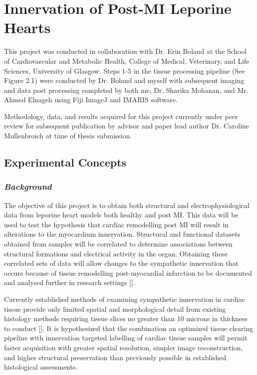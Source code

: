 \section{Innervation of Post-MI Leporine Hearts}
This project was conducted in collaboration with Dr. Erin Boland at the School of Cardiovascular and Metabolic Health, College of Medical, Veterinary, and Life Sciences, University of Glasgow. Steps 1-5 in the tissue processing pipeline (See Figure 2.1) were conducted by Dr. Boland and myself with subsequent imaging and data post processing completed by both me, Dr. Sharika Mohanan, and Mr. Ahmed Elnageh using Fiji ImageJ and IMARIS software. 

Methodology, data, and results acquired for this project currently under peer review for subsequent publication by advisor and paper lead author Dr. Caroline Mullenbroich at time of thesis submission. 

\subsection{Experimental Concepts}
\subsubsection{\textit{Background}}
The objective of this project is to obtain both structural and electrophysiological data from leporine heart models both healthy and post MI. This data will be used to test the hypothesis that cardiac remodelling post MI will result in alterations to the myocardium innervation. Structural and functional datasets obtained from samples will be correlated to determine associations between structural formations and electrical activity in the organ. Obtaining these correlated sets of data will allow changes to the sympathetic innervation that occurs because of tissue remodelling post-myocardial infarction to be documented and analysed further in research settings [].


Currently established methods of examining sympathetic innervation in cardiac tissue provide only limited spatial and morphological detail from existing histology methods requiring tissue slices no greater than 10 microns in thickness to conduct []. It is hypothesized that the combination an optimized tissue clearing pipeline with innervation targeted labelling of cardiac tissue samples will permit faster acquisition with greater spatial resolution, simpler image reconstruction, and higher structural preservation than previously possible in established histological assessments.

